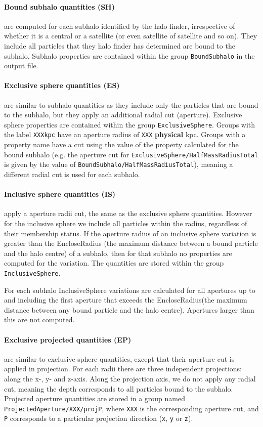 \documentclass{article}
\begin{document}
\paragraph{Bound subhalo quantities (SH)} are computed for each subhalo identified by the halo finder, irrespective of whether 
it is a central or a satellite (or even satellite of satellite and so on). They include all particles
that they halo finder has determined are bound to the subhalo. Subhalo properties are contained within the group 
\verb+BoundSubhalo+ in the output file.

\paragraph{Exclusive sphere quantities (ES)} are similar to subhalo quantities as they include only the 
particles that are bound to the subhalo, but they apply an additional radial cut (aperture). Exclusive sphere 
properties are contained within the group \verb+ExclusiveSphere+. Groups with the label \verb+XXXkpc+ have an
aperture radius of \verb+XXX+ \textbf{physical} kpc. Groups with a property name have a cut using the value 
of the property calculated for the bound subhalo (e.g. the aperture cut for \verb+ExclusiveSphere/HalfMassRadiusTotal+
is given by the value of \verb+BoundSubhalo/HalfMassRadiusTotal+), meaning a different radial cut is used for each subhalo.

\paragraph{Inclusive sphere quantities (IS)} apply a aperture radii cut, the same as the exclusive sphere
quantities. However for the inclusive sphere we include all particles within the radius, regardless of their
membership status. If the aperture radius of an inclusive sphere variation is greater than the EncloseRadius
(the maximum distance between a bound particle and the halo centre) of a subhalo, then for that subhalo no
properties are computed for the variation.
The quantities are stored within the group \verb+InclusiveSphere+.

For each subhalo InclusiveSphere variations are calculated for all apertures up to and including the first
aperture that exceeds the EncloseRadius(the maximum distance between any bound particle and the halo centre).
Apertures larger than this are not computed.

\paragraph{Exclusive projected quantities (EP)} are similar to exclusive sphere quantities, except that their
aperture cut is applied in projection. For each radii there are three  independent projections: along the 
x-, y- and z-axis. Along the projection axis, we do not apply any radial cut, meaning the depth corresponds to all particles 
bound to the subhalo. Projected aperture quantities are stored in a group named 
\verb+ProjectedAperture/XXX/projP+, where \verb+XXX+ is the corresponding aperture cut, and \verb+P+ 
corresponds to a particular projection direction (\verb+x+, \verb+y+ or \verb+z+).
\end{document}

